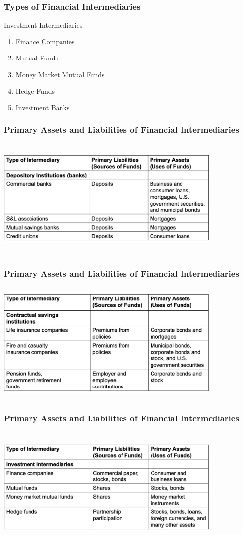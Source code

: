 \documentclass{beamer}
\begin{document}
\begin{frame}
\frametitle{Types of Financial Intermediaries}
Investment Intermediaries
\begin{enumerate}
\item Finance Companies 
\item Mutual Funds  
\item Money Market Mutual Funds 
\item Hedge Funds
\item Investment Banks 
\end{enumerate}

\end{frame}




\frame
{
\frametitle{Primary Assets and Liabilities of Financial Intermediaries }
\centering \includegraphics[height=6cm,width=11cm]{Picture4}
}


\frame
{
\frametitle{Primary Assets and Liabilities of Financial Intermediaries }
\centering \includegraphics[height=6cm,width=11cm]{Picture5}
}


\frame
{
\frametitle{Primary Assets and Liabilities of Financial Intermediaries}
\centering \includegraphics[height=6cm,width=11cm]{Picture6}
}
\end{document}

